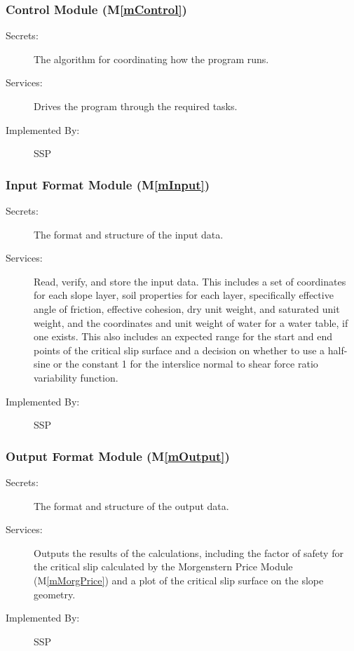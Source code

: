 \documentclass[12pt, titlepage]{article}
\newcommand{\progname}{SSP}
\newcommand{\mref}[1]{M\ref{#1}}
\begin{document}
\subsubsection{Control Module (\mref{mControl})}

\begin{description}
\item[Secrets:] The algorithm for coordinating how the program runs.
\item[Services:] Drives the program through the required tasks.
\item[Implemented By:] \progname
\end{description}


\subsubsection{Input Format Module (\mref{mInput})}

\begin{description}
\item[Secrets:]The format and structure of the input data.
\item[Services:] Read, verify, and store the input data. This includes a set of 
  coordinates for each slope layer, soil properties for each layer, 
  specifically effective angle of friction, effective cohesion, dry unit 
  weight, and saturated unit weight, and the coordinates and unit weight of 
  water for a water table, if one exists. This also includes an expected range 
  for the start and end points of the critical slip surface and a decision on 
  whether to use a half-sine or the constant 1 for the interslice normal to 
  shear force ratio variability function.
\item[Implemented By:] \progname
\end{description}

\subsubsection{Output Format Module (\mref{mOutput})}

\begin{description}
\item[Secrets:] The format and structure of the output data.
\item[Services:] Outputs the results of the calculations, including
  the factor of safety for the critical slip calculated by the
  Morgenstern Price Module (\mref{mMorgPrice}) and a plot of the critical
  slip surface on the slope geometry.
\item[Implemented By:] \progname
\end{description} 
\end{document}
